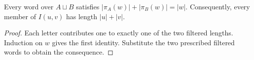 \begin{lemma}
\label{lem:tagged_interleavings_length}
\leanok
{}
Every word over $A\sqcup B$ satisfies
$|\pi_A(w)|+|\pi_B(w)|=|w|$.
Consequently, every member of $I(u,v)$ has length $|u|+|v|$.
\end{lemma}
\begin{proof}
\leanok
{}
Each letter contributes one to exactly one of the two filtered lengths.
Induction on $w$ gives the first identity.  Substitute the two prescribed
filtered words to obtain the consequence.
\end{proof}
